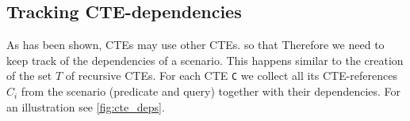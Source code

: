 

\subsection{Tracking CTE-dependencies}\label{tracking_cte_dependencies}
As has been shown, CTEs may use other CTEs. so that Therefore we need to keep track of the dependencies of a scenario. This happens similar to the creation of the set $T$ of recursive CTEs. For each CTE \texttt{C} we collect all its CTE-references \texttt{$C_i$} from the scenario (predicate and query) together with their dependencies. For an illustration see \autoref{fig:cte_deps}.

